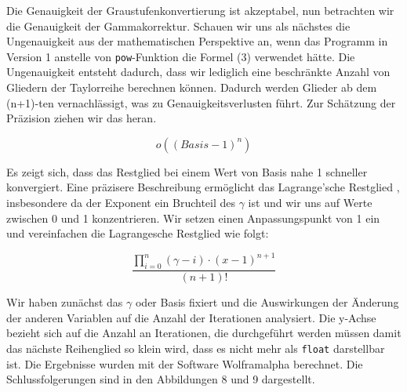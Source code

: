 \documentclass[course=erap]{aspdoc}
\begin{document}
\par
Die Genauigkeit der Graustufenkonvertierung ist akzeptabel, nun betrachten wir die Genauigkeit der Gammakorrektur. Schauen wir uns als nächstes die Ungenauigkeit aus der mathematischen Perspektive an, wenn das Programm in Version 1 anstelle von \texttt{pow}-Funktion die Formel (3) verwendet hätte. Die Ungenauigkeit entsteht dadurch, dass wir lediglich eine beschränkte Anzahl von Gliedern der Taylorreihe berechnen können. Dadurch werden Glieder ab dem (n+1)-ten vernachlässigt, was zu Genauigkeitsverlusten führt. Zur Schätzung der Präzision ziehen wir das  \cite{mathematiknet2009taylorpolynome} heran.

\[
o\left((Basis-1)^n\right)
\]

\par
Es zeigt sich, dass das Restglied bei einem Wert von Basis nahe 1 schneller konvergiert. Eine präzisere Beschreibung ermöglicht das Lagrange'sche Restglied \cite{biancahoegel2021taylorformel}, insbesondere da der Exponent ein Bruchteil des $\gamma$ ist und wir uns auf Werte zwischen 0 und 1 konzentrieren. Wir setzen einen Anpassungspunkt von 1 ein und vereinfachen die Lagrangesche Restglied wie folgt:

\[
\frac{{\prod_{i=0}^{n} (\gamma - i) \cdot (x-1)^{n+1}}}{{(n+1)!}} \label{eq:gamma_product}
\]

\par
Wir haben zunächst das $\gamma$ oder Basis fixiert und die Auswirkungen der Änderung der anderen Variablen auf die Anzahl der Iterationen analysiert. Die y-Achse bezieht sich auf die Anzahl an Iterationen, die durchgeführt werden müssen damit das nächste Reihenglied so klein wird, dass es nicht mehr als \texttt{float} darstellbar ist. Die Ergebnisse wurden mit der Software Wolframalpha berechnet. Die Schlussfolgerungen sind in den Abbildungen 8 und 9 dargestellt.
\end{document}
